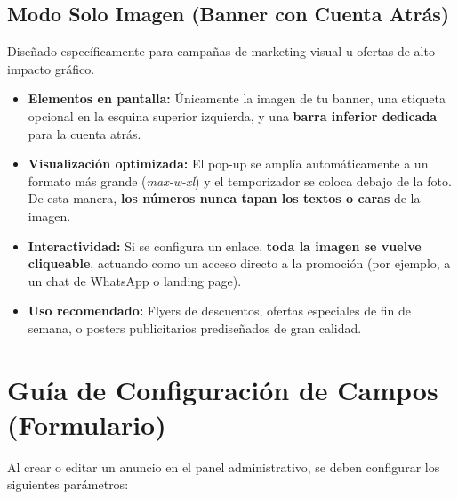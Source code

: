 \documentclass[11pt,a4paper]{article}
\begin{document}
\subsection{Modo Solo Imagen (Banner con Cuenta Atrás)}
Diseñado específicamente para campañas de marketing visual u ofertas de alto impacto gráfico.
\begin{itemize}
    \item \textbf{Elementos en pantalla:} Únicamente la imagen de tu banner, una etiqueta opcional en la esquina superior izquierda, y una \textbf{barra inferior dedicada} para la cuenta atrás.
    \item \textbf{Visualización optimizada:} El pop-up se amplía automáticamente a un formato más grande (\textit{max-w-xl}) y el temporizador se coloca debajo de la foto. De esta manera, \textbf{los números nunca tapan los textos o caras} de la imagen.
    \item \textbf{Interactividad:} Si se configura un enlace, \textbf{toda la imagen se vuelve cliqueable}, actuando como un acceso directo a la promoción (por ejemplo, a un chat de WhatsApp o landing page).
    \item \textbf{Uso recomendado:} Flyers de descuentos, ofertas especiales de fin de semana, o posters publicitarios prediseñados de gran calidad.
\end{itemize}

\newpage

\section{Guía de Configuración de Campos (Formulario)}
Al crear o editar un anuncio en el panel administrativo, se deben configurar los siguientes parámetros:
\end{document}
